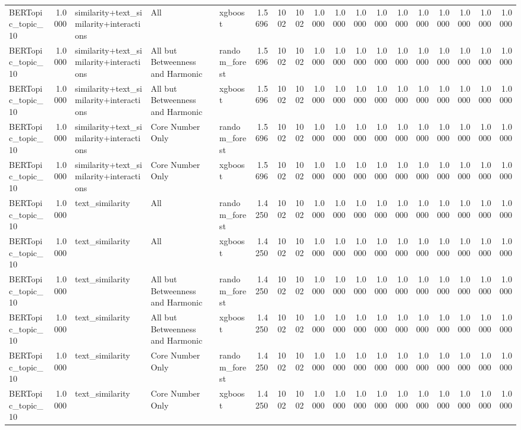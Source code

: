 \begin{tabular}{lrlllrrrrrrrrrrrrr}
BERTopic_topic_10 & 1.0000 & similarity+text_similarity+interactions & All & xgboost & 1.5696 & 1002 & 1002 & 1.0000 & 1.0000 & 1.0000 & 1.0000 & 1.0000 & 1.0000 & 1.0000 & 1.0000 & 1.0000 & 1.0000 \\
BERTopic_topic_10 & 1.0000 & similarity+text_similarity+interactions & All but Betweenness and Harmonic & random_forest & 1.5696 & 1002 & 1002 & 1.0000 & 1.0000 & 1.0000 & 1.0000 & 1.0000 & 1.0000 & 1.0000 & 1.0000 & 1.0000 & 1.0000 \\
BERTopic_topic_10 & 1.0000 & similarity+text_similarity+interactions & All but Betweenness and Harmonic & xgboost & 1.5696 & 1002 & 1002 & 1.0000 & 1.0000 & 1.0000 & 1.0000 & 1.0000 & 1.0000 & 1.0000 & 1.0000 & 1.0000 & 1.0000 \\
BERTopic_topic_10 & 1.0000 & similarity+text_similarity+interactions & Core Number Only & random_forest & 1.5696 & 1002 & 1002 & 1.0000 & 1.0000 & 1.0000 & 1.0000 & 1.0000 & 1.0000 & 1.0000 & 1.0000 & 1.0000 & 1.0000 \\
BERTopic_topic_10 & 1.0000 & similarity+text_similarity+interactions & Core Number Only & xgboost & 1.5696 & 1002 & 1002 & 1.0000 & 1.0000 & 1.0000 & 1.0000 & 1.0000 & 1.0000 & 1.0000 & 1.0000 & 1.0000 & 1.0000 \\
BERTopic_topic_10 & 1.0000 & text_similarity & All & random_forest & 1.4250 & 1002 & 1002 & 1.0000 & 1.0000 & 1.0000 & 1.0000 & 1.0000 & 1.0000 & 1.0000 & 1.0000 & 1.0000 & 1.0000 \\
BERTopic_topic_10 & 1.0000 & text_similarity & All & xgboost & 1.4250 & 1002 & 1002 & 1.0000 & 1.0000 & 1.0000 & 1.0000 & 1.0000 & 1.0000 & 1.0000 & 1.0000 & 1.0000 & 1.0000 \\
BERTopic_topic_10 & 1.0000 & text_similarity & All but Betweenness and Harmonic & random_forest & 1.4250 & 1002 & 1002 & 1.0000 & 1.0000 & 1.0000 & 1.0000 & 1.0000 & 1.0000 & 1.0000 & 1.0000 & 1.0000 & 1.0000 \\
BERTopic_topic_10 & 1.0000 & text_similarity & All but Betweenness and Harmonic & xgboost & 1.4250 & 1002 & 1002 & 1.0000 & 1.0000 & 1.0000 & 1.0000 & 1.0000 & 1.0000 & 1.0000 & 1.0000 & 1.0000 & 1.0000 \\
BERTopic_topic_10 & 1.0000 & text_similarity & Core Number Only & random_forest & 1.4250 & 1002 & 1002 & 1.0000 & 1.0000 & 1.0000 & 1.0000 & 1.0000 & 1.0000 & 1.0000 & 1.0000 & 1.0000 & 1.0000 \\
BERTopic_topic_10 & 1.0000 & text_similarity & Core Number Only & xgboost & 1.4250 & 1002 & 1002 & 1.0000 & 1.0000 & 1.0000 & 1.0000 & 1.0000 & 1.0000 & 1.0000 & 1.0000 & 1.0000 & 1.0000 \\

\end{tabular}
